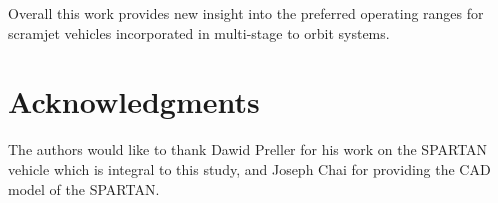 \documentclass[]{aiaa-tc}
\begin{document}
 Overall this work provides new insight into the preferred operating ranges for scramjet vehicles incorporated in multi-stage to orbit systems.

 


\section*{Acknowledgments}

The authors would like to thank Dawid Preller for his work on the SPARTAN vehicle which is integral to this study, and Joseph Chai for providing the CAD model of the SPARTAN.

\footnotesize



\end{document}
